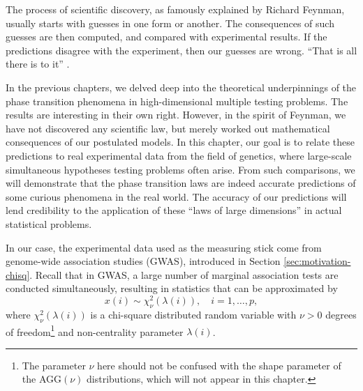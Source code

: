 
The process of scientific discovery, as famously explained by Richard Feynman, usually starts with guesses in one form or another.
The consequences of such guesses are then computed, and compared with experimental results.
If the predictions disagree with the experiment, then our guesses are wrong. ``That is all there is to it''  \citep{feynman2017character}.

In the previous chapters, we delved deep into the theoretical underpinnings of the phase transition phenomena in high-dimensional multiple testing problems.
The results are interesting in their own right.
However, in the spirit of Feynman, we have not discovered any scientific law, but merely worked out mathematical consequences of our postulated models.
In this chapter, our goal is to relate these predictions to real experimental data from the field of genetics, where large-scale simultaneous hypotheses testing problems often arise.
From such comparisons, we will demonstrate that the phase transition laws are indeed accurate predictions of some curious phenomena in the real world.
The accuracy of our predictions will lend credibility to the application of these ``laws of large dimensions'' in actual statistical problems.

\medskip

In our case, the experimental data used as the measuring stick come from genome-wide association studies (\ac{GWAS}), introduced in Section \ref{sec:motivation-chisq}.
Recall that in \ac{GWAS}, a large number of marginal association tests are conducted simultaneously, resulting in statistics that can be approximated by
\begin{equation} \label{eq:model-chisq-Chapter6}
    x(i) \sim \chi_\nu^2\left(\lambda(i)\right), \quad i=1,\ldots,p,
\end{equation}
where $\chi_\nu^2\left(\lambda(i)\right)$ is a chi-square distributed random variable with $\nu>0$ degrees of 
freedom\footnote{The parameter $\nu$ here should not be confused with the shape parameter of the AGG$(\nu)$ 
distributions, which will not appear in this chapter.} and non-centrality parameter $\lambda(i)$.


